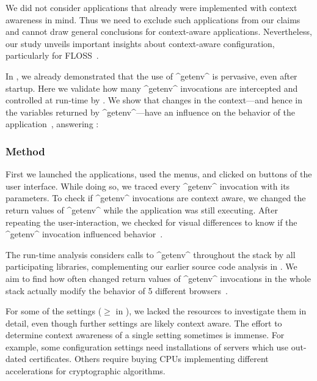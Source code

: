 We did not consider applications that already were implemented with context awareness in mind.
Thus we need to exclude such applications from our claims and cannot draw general conclusions for context-aware applications.
Nevertheless, our study unveils important insights about context-aware configuration, particularly for FLOSS~\cite{raab2016unanticipated}.




In , we already demonstrated that the use of ^getenv^ is pervasive, even after startup.
Here we validate how many ^getenv^ invocations are intercepted and controlled at run-time by \elektra{}.
We show that changes in the context---and hence in the variables returned by ^getenv^---have an influence on the behavior of the application~\cite{raab2016unanticipated}, answering :
\rqUnmodifiedWhich*

\subsubsection{Method}

First we launched the applications, used the menus, and clicked on buttons of the user interface.
While doing so, we traced every ^getenv^ invocation with its parameters.
To check if ^getenv^ invocations are context aware, we changed the return values of ^getenv^ while the application was still executing.
After repeating the user-interaction, we checked for visual differences to know if the ^getenv^ invocation influenced behavior~\cite{raab2017introducing}.

The run-time analysis considers calls to ^getenv^ throughout the stack by all participating libraries, complementing our earlier source code analysis in .
We aim to find how often changed return values of ^getenv^ invocations in the whole stack actually modify the behavior of 5 different browsers~\cite{raab2017introducing}.

For some of the settings ($\geq$ in ), we lacked the resources to investigate them in detail, even though further settings are likely context aware.
The effort to determine context awareness of a single setting sometimes is immense.
For example, some configuration settings need installations of servers which use out-dated certificates.
Others require buying CPUs implementing different accelerations for cryptographic algorithms.


